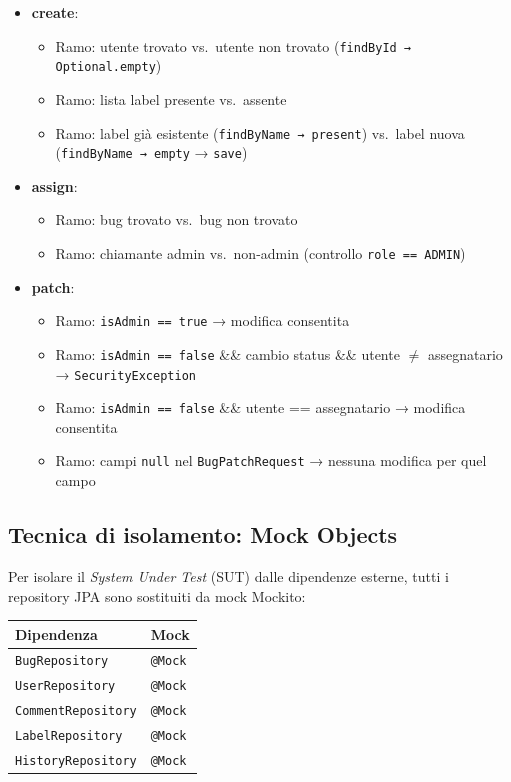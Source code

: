 \begin{itemize}
    \item \textbf{create}:
    \begin{itemize}
        \item Ramo: utente trovato vs.\ utente non trovato (\texttt{findById → Optional.empty})
        \item Ramo: lista label presente vs.\ assente
        \item Ramo: label già esistente (\texttt{findByName → present}) vs.\ label nuova (\texttt{findByName → empty} → \texttt{save})
    \end{itemize}

    \item \textbf{assign}:
    \begin{itemize}
        \item Ramo: bug trovato vs.\ bug non trovato
        \item Ramo: chiamante admin vs.\ non-admin (controllo \texttt{role == ADMIN})
    \end{itemize}

    \item \textbf{patch}:
    \begin{itemize}
        \item Ramo: \texttt{isAdmin == true} → modifica consentita
        \item Ramo: \texttt{isAdmin == false} \&\& cambio status \&\& utente $\neq$ assegnatario → \texttt{SecurityException}
        \item Ramo: \texttt{isAdmin == false} \&\& utente == assegnatario → modifica consentita
        \item Ramo: campi \texttt{null} nel \texttt{BugPatchRequest} → nessuna modifica per quel campo
    \end{itemize}
\end{itemize}

\subsection{Tecnica di isolamento: Mock Objects}

Per isolare il \emph{System Under Test} (SUT) dalle dipendenze esterne,
tutti i repository JPA sono sostituiti da mock Mockito:

\begin{center}
\small
\begin{tabular}{|l|l|}
\hline
\textbf{Dipendenza} & \textbf{Mock} \\
\hline
\texttt{BugRepository}     & \texttt{@Mock} \\
\texttt{UserRepository}    & \texttt{@Mock} \\
\texttt{CommentRepository} & \texttt{@Mock} \\
\texttt{LabelRepository}   & \texttt{@Mock} \\
\texttt{HistoryRepository} & \texttt{@Mock} \\
\hline
\end{tabular}
\end{center}

